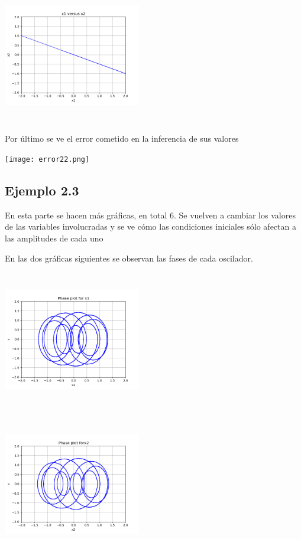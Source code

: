 \documentclass{article}
\begin{document}
\begin{center}
  \includegraphics[width=6cm, height=6cm]{ej2_22.png}
\end{center}

Por último se ve el error cometido en la inferencia de sus valores
\begin{center}
  \texttt{[image: error22.png]}
\end{center}

\subsection{Ejemplo 2.3}

En esta parte se hacen más gráficas, en total 6. Se vuelven a cambiar los valores de las variables involucradas y se ve cómo las condiciones iniciales sólo afectan a las amplitudes de cada uno

En las dos gráficas siguientes se observan las fases de cada oscilador.

\begin{center}
  \includegraphics[width=6cm, height=6cm]{ej2_31.png}
\end{center}

\begin{center}
  \includegraphics[width=6cm, height=6cm]{ej2_32.png}
\end{center}
\end{document}
